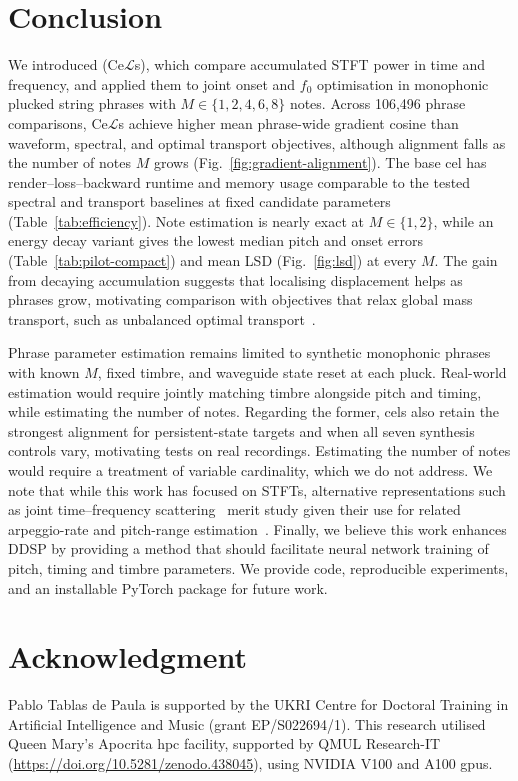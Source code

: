 \documentclass[letterpaper]{article}
\begin{document}
\section{Conclusion}
We introduced  (Ce$\mathcal L$s), which compare accumulated STFT power in time and frequency, and applied them to joint onset and $f_0$ optimisation in monophonic plucked string phrases with $M\in\{1,2,4,6,8\}$ notes. Across 106,496 phrase comparisons, Ce$\mathcal L$s achieve higher mean phrase-wide gradient cosine than waveform, spectral, and optimal transport objectives, although alignment falls as the number of notes $M$ grows (Fig.~\ref{fig:gradient-alignment}). The base \gls{cel} has render--loss--backward runtime and memory usage comparable to the tested spectral and transport baselines at fixed candidate parameters (Table~\ref{tab:efficiency}). Note estimation is nearly exact at $M\in\{1,2\}$, while an energy decay variant gives the lowest median pitch and onset errors (Table~\ref{tab:pilot-compact}) and mean LSD (Fig.~\ref{fig:lsd}) at every $M$. The gain from decaying accumulation suggests that localising displacement helps as phrases grow, motivating comparison with objectives that relax global mass transport, such as unbalanced optimal transport~\cite{sejourne2023unbalanced}.

Phrase parameter estimation remains limited to synthetic monophonic phrases with known $M$, fixed timbre, and waveguide state reset at each pluck. Real-world estimation would require jointly matching timbre alongside pitch and timing, while estimating the number of notes. Regarding the former, \glspl{cel} also retain the strongest alignment for persistent-state targets and when all seven synthesis controls vary, motivating tests on real recordings. Estimating the number of notes would require a treatment of variable cardinality, which we do not address. We note that while this work has focused on STFTs, alternative representations such as joint time--frequency scattering~\cite{anden2019joint} merit study given their use for related arpeggio-rate and pitch-range estimation~\cite{vahidi2023mesostructures}. Finally, we believe this work enhances DDSP by providing a method that should facilitate neural network training of pitch, timing and timbre parameters. We provide code, reproducible experiments, and an installable PyTorch package for future work.

\section{Acknowledgment}
Pablo Tablas de Paula is supported by the UKRI Centre for Doctoral Training in
Artificial Intelligence and Music (grant EP/S022694/1). This research utilised
Queen Mary's Apocrita \gls{hpc} facility, supported by QMUL Research-IT
(\url{https://doi.org/10.5281/zenodo.438045}), using NVIDIA V100 and A100 \glspl{gpu}.
\end{document}
